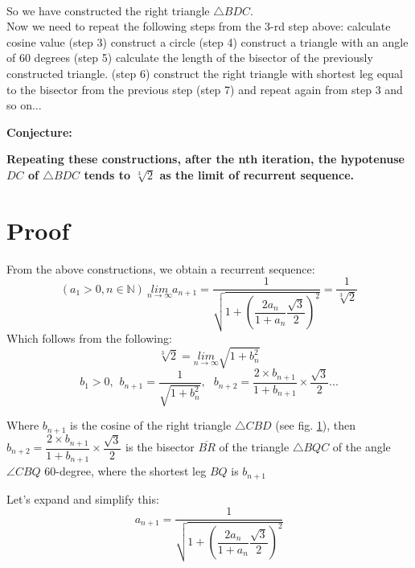 \documentclass[12pt, letterpaper, oneside]{report}
\begin{document}
\begin{enumerate}
\begin{figure}[h]
	\caption{}
	\label{fig:bdc}
\end{figure}\\
So we have constructed the right triangle $\triangle BDC$.
\\
Now we need to repeat the following steps from the 3-rd step above:
\subitem calculate cosine value (step 3)
\subitem construct a circle (step 4)
\subitem construct a triangle with an angle of 60 degrees (step 5)
\subitem calculate the length of the bisector of the previously constructed triangle. (step 6)
\subitem construct the right triangle with shortest leg equal to the bisector from the previous step (step 7)
\subitem and repeat again from step 3
\subitem and so on...\\
\vspace{10mm}
\par
\textbf{\large {Conjecture:}}
\par

\textbf{Repeating these constructions, after the nth iteration, the hypotenuse ${DC}$ of $\triangle BDC$ tends to $\sqrt[3]{2}$ as the limit of recurrent sequence.}

\newpage
\section{Proof}
From the above constructions, we obtain a recurrent sequence:
\begin{equation}
( a_{1} > 0,  n \in \mathbb N ) \ \underset{n\to \infty }{lim} a_{n+1} = \dfrac{ 1 }{ \sqrt{ 1 + \left( \dfrac{ 2 a_{ n } }{ 1 + a_{ n } } \dfrac{ \sqrt{ 3 } }{ 2 } \right)^{2} } } =\dfrac{ 1 }{ \sqrt[3]{ 2 } }
\end{equation}\label{eq:recurr-relation}
Which follows from the following:
\begin{equation}
\sqrt[3]{2}= \underset{n\to \infty }{lim} \sqrt{1+b_{n}^2}
\end{equation}
\begin{equation}
b_{1}>0, \hspace{5pt} b_{n+1}=\dfrac{1}{\sqrt{1+b_{n}^{2}}},\ \hspace{5pt} b_{n+2}=\dfrac{2\times b_{n+1}}{1+b_{n+1}}\times\dfrac{\sqrt{3}}{2} ...
\end{equation}

Where $b_{n+1}$ is the cosine of the right triangle $\triangle CBD$ (see fig. \ref{fig:bdc}), \newline then $b_{n+2}=\dfrac{2\times b_{n+1}}{1+b_{n+1}}\times\dfrac{\sqrt{3}}{2}$ is the bisector $\overline{BR}$ of the triangle $\triangle BQC$ of the angle $\angle CBQ$ 60-degree, where the shortest leg $BQ$  is $ b_{n+1} $ 


\end{enumerate}
Let's expand and simplify this:
\[
a_{n+1} =\dfrac{ 1 }{ \sqrt{ 1 + \left( \dfrac{ 2 a_{ n } }{ 1 + a_{ n } }\dfrac{ \sqrt{ 3 } }{ 2 }\right)^{ 2 } } }
\]
\end{document}
